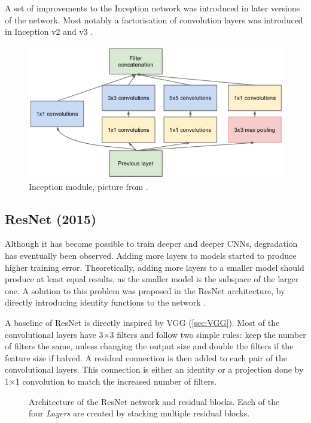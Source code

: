 A set of improvements to the Inception network was introduced in later versions of the network. Most notably a factorisation of convolution layers was introduced in Inception v2 and v3 \cite{bib:inception2}.


\begin{figure}
    \includegraphics[width=\textwidth]{img/inception}
    \caption{Inception module, picture from \cite[figure 2]{bib:googlenet}.}
    \label{fig:incept_mod}
\end{figure}

\subsection{ResNet (2015)}
\label{sec:resnet}

Although it has become possible to train deeper and deeper CNNs, degradation has eventually been observed. Adding more layers to models started to produce higher training error. Theoretically, adding more layers to a smaller model should produce at least equal results, as the smaller model is the subspace of the larger one. A solution to this problem was proposed in the ResNet architecture, by directly introducing identity functions to the network \cite{bib:resnet}.  

A baseline of ResNet is directly inspired by VGG (\cref{sec:VGG}). Most of the convolutional layers have 3$\times$3 filters and follow two simple rules: keep the number of filters the same, unless changing the output size and double the filters if the feature size if halved. A residual connection is then added to each pair of the convolutional layers. This connection is either an identity or a projection done by 1$\times$1 convolution to match the increased number of filters. 

\begin{figure}
    \resnetArch
    \caption{Architecture of the ResNet network and residual blocks. Each of the four \textit{Layers} are created by stacking multiple residual blocks.}
    \label{fig:resnet_arch}
\end{figure}

